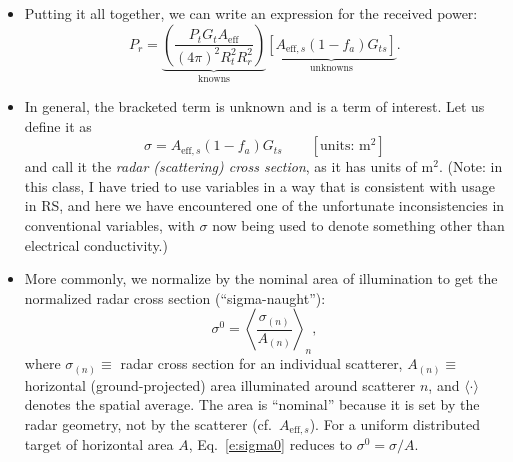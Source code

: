 \documentclass[11pt, oneside]{article}
\begin{document}
\begin{itemize}
	\item Putting it all together, we can write an expression for the received power:
	\begin{equation}
		\label{e:radar}
		P_r = \underbrace{\left(\frac{P_tG_tA_\mathrm{eff}}{\left(4\pi\right)^2R_t^2R_r^2}\right)}_{\text{knowns}}\underbrace{\left[A_{\mathrm{eff},s}\left(1 - f_a\right)G_{ts}\right]}_{\text{unknowns}}.
	\end{equation}
	\item In general, the bracketed term is unknown and is a term of interest. Let us define it as
	\begin{equation}
		\label{e:rcs}
		\sigma = A_{\mathrm{eff},s}\left(1 - f_a\right)G_{ts} \qquad [\text{units: m}^2]
	\end{equation}
	and call it the \emph{radar (scattering) cross section}, as it has units of m$^2$. (Note: in this class, I have tried to use variables in a way that is consistent with usage in RS, and here we have encountered one of the unfortunate inconsistencies in conventional variables, with $\sigma$ now being used to denote something other than electrical conductivity.)
	\item More commonly, we normalize by the nominal area of illumination to get the normalized radar cross section (``sigma-naught''):
	\begin{equation}
		\label{e:sigma0}
		\sigma^0 = \left\langle\frac{\sigma_{(n)}}{A_{(n)}}\right\rangle_n,
	\end{equation}
	where $\sigma_{(n)} \equiv$ radar cross section for an individual scatterer, $A_{(n)} \equiv$ horizontal (ground-projected) area illuminated around scatterer $n$, and $\langle\cdot\rangle$ denotes the spatial average. The area is ``nominal'' because it is set by the radar geometry, not by the scatterer (cf.\ $A_{\mathrm{eff},s}$). For a uniform distributed target of horizontal area $A$, Eq.~\eqref{e:sigma0} reduces to $\sigma^0 = \sigma/A$.
\end{itemize}
\end{document}
